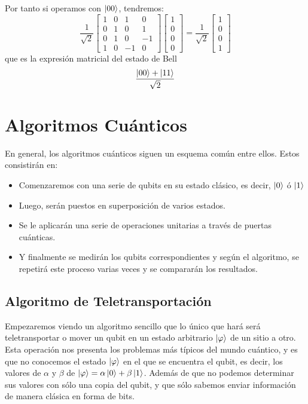 \documentclass[a4paper]{article}
\numberwithin{equation}{section}
\begin{document}
Por tanto si operamos con $\ket{00}$, tendremos:
\begin{equation}
\frac{1}{\sqrt{2}}
\begin{bmatrix}
1 & 0 & 1 & 0 \\
0 & 1 & 0 & 1 \\
0 & 1 & 0 & -1 \\
1 & 0 & -1 & 0
\end{bmatrix}
\begin{bmatrix}
1 \\ 0 \\ 0 \\ 0
\end{bmatrix} = 
\frac{1}{\sqrt{2}}
\begin{bmatrix}
1 \\ 0 \\ 0 \\ 1
\end{bmatrix}
\end{equation}
que es la expresión matricial del estado de Bell
\begin{equation}
\frac{\ket{00} + \ket{11}}{\sqrt{2}}
\end{equation}
\newpage

\section{Algoritmos Cuánticos}

En general, los algoritmos cuánticos siguen un esquema común entre ellos. Estos consistirán en:
\begin{itemize}
\item Comenzaremos con una serie de qubits en su estado clásico, es decir, $\ket{0}$ ó $\ket{1}$
\item Luego, serán puestos en superposición de varios estados.
\item Se le aplicarán una serie de operaciones unitarias a través de puertas cuánticas.
\item Y finalmente se medirán los qubits correspondientes y según el algoritmo, se repetirá este proceso varias veces y se compararán los resultados.

\end{itemize}

\subsection{Algoritmo de Teletransportación}
Empezaremos viendo un algoritmo sencillo que lo único que hará será teletransportar o mover un qubit en un estado arbitrario $\ket{\varphi}$ de un sitio a otro. Esta operación nos presenta los problemas más típicos del mundo cuántico, y es que no conocemos el estado $\ket{\varphi}$ en el que se encuentra el qubit, es decir, los valores de $\alpha$ y $\beta$ de $\ket{\varphi} = \alpha\ket{0} + \beta\ket{1}$. Además de que no podemos determinar sus valores con sólo una copia del qubit, y que sólo sabemos enviar información de manera clásica en forma de bits.\\
\end{document}
